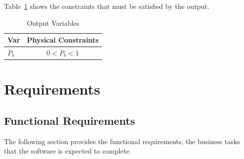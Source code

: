 \documentclass[12pt]{article}
\begin{document}
Table~\ref{TblOutputVar} shows the constraints that must be satisfied by the output.

\begin{table}[!h]
\caption{Output Variables} \label{TblOutputVar}
\renewcommand{\arraystretch}{1.2}
\begin{center}
\begin{tabular}{l c} 
\toprule
\textbf{Var} & \textbf{Physical Constraints} \\
\midrule 
$P_b$ & $0 < P_b < 1$\\
\bottomrule
\end{tabular}
\end{center}
\end{table}
  
\section{Requirements}  
  
\subsection{Functional Requirements} \label{Func}

The following section provides the functional requirements, the business tasks
that the software is expected to complete.
\end{document}
